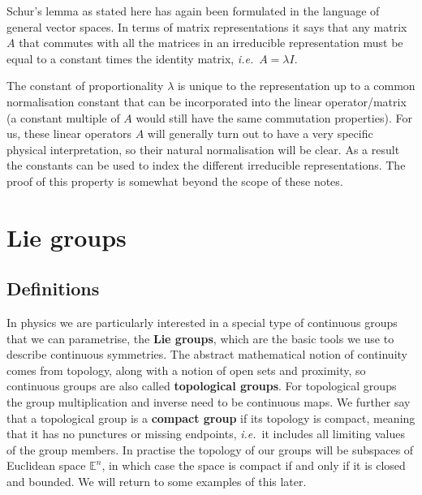 \documentclass[notes.tex]{subfiles}
\begin{document}
Schur's lemma as stated here has again been formulated in the language of general vector spaces. In terms of matrix representations it says that any matrix $A$ that commutes with all the matrices in an irreducible representation must be equal to a constant times the identity matrix, {\it i.e.}\ $A=\lambda I$.

The constant of proportionality $\lambda$ is unique to the representation up to a common normalisation constant that can be incorporated into the linear operator/matrix (a constant multiple of $A$ would still have the same commutation properties). For us, these linear operators $A$ will generally turn out to have a very specific physical interpretation, so their natural normalisation will be clear. As a result the constants can be used to index the different irreducible representations. The proof of this property is somewhat beyond the scope of these notes.



\section{Lie groups}
\label{sec:Lie_groups}


\subsection{Definitions}
\label{sec:Lie_group_definitions}
In physics we are particularly interested in a special type of continuous groups that we can parametrise, the {\bf Lie groups}, which are the basic tools we use to describe continuous symmetries. The abstract mathematical notion of continuity comes from topology, along with a notion of open sets and proximity, so continuous groups are also called {\bf topological groups}. For topological groups the group multiplication and inverse need to be continuous maps. We further say that a topological group is a {\bf compact group} if its topology is compact, meaning that it has no punctures or missing endpoints, {\it i.e.}\ it includes all limiting values of the group members. In practise the topology of our groups will be subspaces of Euclidean space $\mathbb E^n$, in which case the space is compact if and only if it is closed and bounded. We will return to some examples of this later.
\end{document}
